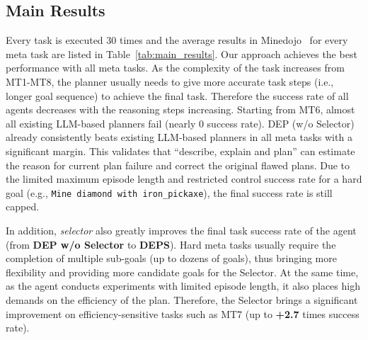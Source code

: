 \documentclass{article}
\begin{document}


\subsection{Main Results}\label{sec:results}

Every task is executed 30 times and the average results in Minedojo~\cite{minedojo} for every meta task are listed in Table~\ref{tab:main_results}. 
Our approach achieves the best performance with all meta tasks.
As the complexity of the task increases from MT1-MT8, the planner usually needs to give more accurate task steps (i.e., longer goal sequence) to achieve the final task. 
Therefore the success rate of all agents decreases with the reasoning steps increasing. 
Starting from MT6, almost all existing LLM-based planners fail (nearly 0 success rate).
DEP (w/o Selector) already consistently beats existing LLM-based planners in all meta tasks with a significant margin. 
This validates that ``describe, explain and plan'' can estimate the reason for current plan failure and correct the original flawed plans.
Due to the limited maximum episode length and restricted control success rate for a hard goal (e.g., \texttt{Mine diamond with iron\_pickaxe}), the final success rate is still capped.




In addition, \textit{selector} also greatly improves the final task success rate of the agent (from \textbf{DEP w/o Selector} to \textbf{DEPS}). 
Hard meta tasks usually require the completion of multiple sub-goals (up to dozens of goals), thus bringing more flexibility and providing more candidate goals for the Selector. At the same time, as the agent conducts experiments with limited episode length, it also places high demands on the efficiency of the plan. Therefore, the Selector brings a significant improvement on efficiency-sensitive tasks such as MT7 (up to \textbf{+2.7} times success rate).
\end{document}

